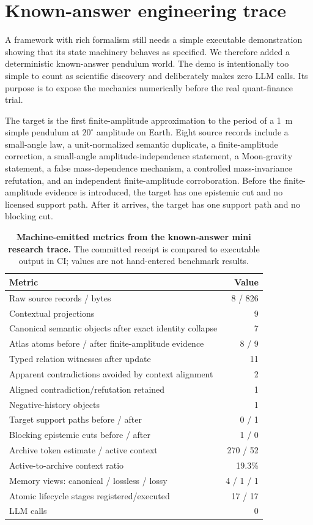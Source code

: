 \section{Known-answer engineering trace}
A framework with rich formalism still needs a simple executable demonstration showing that its state machinery behaves as specified. We therefore added a deterministic known-answer pendulum world. The demo is intentionally too simple to count as scientific discovery and deliberately makes zero LLM calls. Its purpose is to expose the mechanics numerically before the real quant-finance trial.

The target is the first finite-amplitude approximation to the period of a 1~m simple pendulum at $20^\circ$ amplitude on Earth. Eight source records include a small-angle law, a unit-normalized semantic duplicate, a finite-amplitude correction, a small-angle amplitude-independence statement, a Moon-gravity statement, a false mass-dependence mechanism, a controlled mass-invariance refutation, and an independent finite-amplitude corroboration. Before the finite-amplitude evidence is introduced, the target has one epistemic cut and no licensed support path. After it arrives, the target has one support path and no blocking cut.

\begin{table}[t]
\centering
\small
\caption{\textbf{Machine-emitted metrics from the known-answer mini research trace.} The committed receipt is compared to executable output in CI; values are not hand-entered benchmark results.}
\label{tab:demo}
\begin{tabular}{@{}l r@{}}
\toprule
Metric & Value \\
\midrule
Raw source records / bytes & 8 / 826 \\
Contextual projections & 9 \\
Canonical semantic objects after exact identity collapse & 7 \\
Atlas atoms before / after finite-amplitude evidence & 8 / 9 \\
Typed relation witnesses after update & 11 \\
Apparent contradictions avoided by context alignment & 2 \\
Aligned contradiction/refutation retained & 1 \\
Negative-history objects & 1 \\
Target support paths before / after & 0 / 1 \\
Blocking epistemic cuts before / after & 1 / 0 \\
Archive token estimate / active context & 270 / 52 \\
Active-to-archive context ratio & 19.3\% \\
Memory views: canonical / lossless / lossy & 4 / 1 / 1 \\
Atomic lifecycle stages registered/executed & 17 / 17 \\
LLM calls & 0 \\
\bottomrule
\end{tabular}
\end{table}

